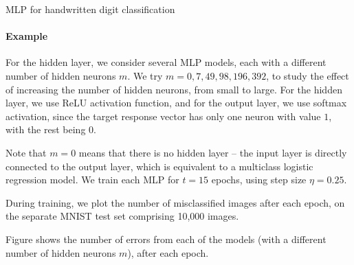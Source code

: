 \begin{frame}{MLP for handwritten digit classification}
\framesubtitle{Example}
    For the hidden layer, we consider several MLP models, each
    with a different number of hidden neurons $m$. We try 
    $m=0, 7, 49, 98, 196, 392$, to study the effect of increasing the
    number of hidden neurons, from small to large. For the hidden layer,
    we use ReLU activation function, and for the output layer, we use
    softmax activation, since the target response vector 
    has only one neuron with value $1$, with the rest being $0$.

\medskip

    Note that $m=0$ means that there is no hidden layer -- the input
    layer is directly connected to the output layer, which is equivalent
    to a multiclass logistic regression model.
    We train each MLP for $t=15$ epochs, using step size $\eta=0.25$.

\medskip

    During training, we plot the number of misclassified images after
    each epoch, on the 
    separate MNIST test set comprising 10,000 images. 

\medskip

Figure shows the number of errors
    from each of the models (with a different number of hidden neurons
    $m$), after each epoch. 

\end{frame}

